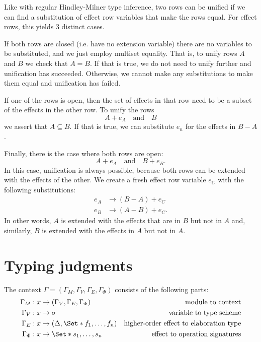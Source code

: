 Like with regular Hindley-Milner type inference, two rows can be unified if we can find a substitution of effect row variables that make the rows equal. For effect rows, this yields 3 distinct cases.

If both rows are closed (i.e. have no extension variable) there are no variables to be substituted, and we just employ multiset equality. That is, to unify rows $A$ and $B$ we check that $A = B$. If that is true, we do not need to unify further and unification has succeeded. Otherwise, we cannot make any substitutions to make them equal and unification has failed.

If one of the rows is open, then the set of effects in that row need to be a subset of the effects in the other row. To unify the rows
\[ A + e_A \quad\text{and}\quad B \]
we assert that $A \subseteq B$. If that is true, we can substitute $e_n$ for the effects in $B - A$.

Finally, there is the case where both rows are open:
\[ A + e_A \quad\text{and}\quad B + e_B. \]
In this case, unification is always possible, because both rows can be extended with the effects of the other. We create a fresh effect row variable $e_C$ with the following substitutions:
\begin{align*}
    e_A &\to (B - A) + e_C \\
    e_B &\to (A - B) + e_C.
\end{align*}
In other words, $A$ is extended with the effects that are in $B$ but not in $A$ and, similarly, $B$ is extended with the effects in $A$ but not in $A$.

\section{Typing judgments}

The context $\Gamma = (\Gamma_M, \Gamma_V, \Gamma_E, \Gamma_\Phi)$ consists of the following parts:
\begin{align*}
    \Gamma_M &: x \to (\Gamma_V, \Gamma_E, \Gamma_\Phi) & \text{module to context}\\
    \Gamma_V &: x \to \sigma & \text{variable to type scheme}\\
    \Gamma_E &: x \to (\Delta, \S{f_1, \dots, f_n}) & \text{higher-order effect to elaboration type}\\
    \Gamma_\Phi &: x \to \S{s_1,\dots,s_n} & \text{effect to operation signatures}
\end{align*}



